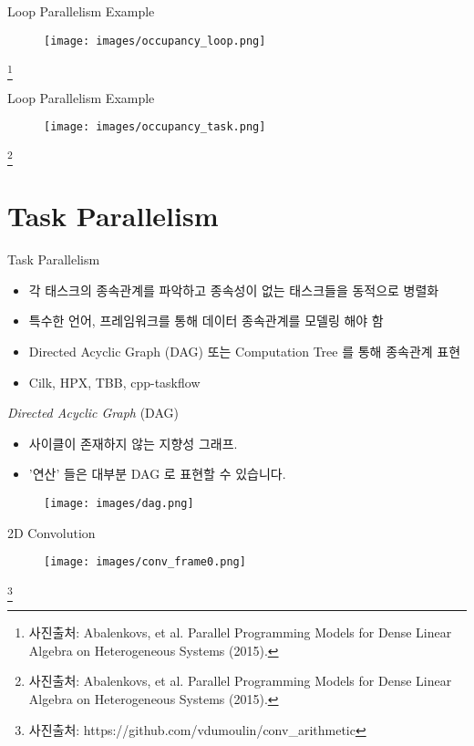 \documentclass{bredelebeamer}
\begin{document}
\begin{frame}[fragile]{Loop Parallelism Example}
  \begin{figure}
    \texttt{[image: images/occupancy\_loop.png]}
  \end{figure}\footnote{사진출처: Abalenkovs, et al. Parallel Programming Models for Dense Linear Algebra on Heterogeneous Systems (2015).}
\end{frame}

\begin{frame}[fragile]{Loop Parallelism Example}
  \begin{figure}
    \texttt{[image: images/occupancy\_task.png]}
  \end{figure}\footnote{사진출처: Abalenkovs, et al. Parallel Programming Models for Dense Linear Algebra on Heterogeneous Systems (2015).}
\end{frame}

\section{Task Parallelism}
\begin{frame}{Task Parallelism}
  \begin{itemize}
  \item 각 태스크의 종속관계를 파악하고 종속성이 없는 태스크들을 동적으로 병렬화
  \item 특수한 언어, 프레임워크를 통해 데이터 종속관계를 모델링 해야 함
  \item Directed Acyclic Graph (DAG) 또는 Computation Tree 를 통해 종속관계 표현
  \item Cilk, HPX, TBB, cpp-taskflow
  \end{itemize}
\end{frame}

\begin{frame}{\textit{Directed Acyclic Graph} (DAG)}
  \begin{itemize}
    \item 사이클이 존재하지 않는 지향성 그래프.
    \item '연산' 들은 대부분 DAG 로 표현할 수 있습니다.
  \end{itemize}
  \begin{figure}
    \texttt{[image: images/dag.png]}
  \end{figure}
\end{frame}

\begin{frame}[fragile]{2D Convolution}
  \begin{figure}
    \texttt{[image: images/conv\_frame0.png]}
  \end{figure}\footnote{사진출처: https://github.com/vdumoulin/conv\_arithmetic}
\end{frame}
\end{document}
